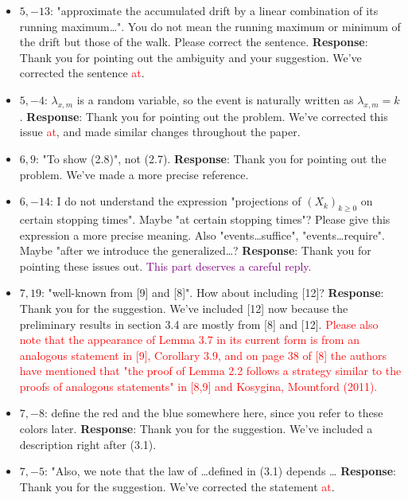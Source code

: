 \documentclass[11pt,a4paper]{article}
\numberwithin{equation}{section}
\newcommand{\edt}[1]{\textcolor{purple}{#1}} %
\def\TBF#1{\textcolor{red}{#1}} %
\begin{document}
\begin{itemize}
		
		\item 
		$5,-13$: "approximate the accumulated drift by a linear combination of its running maximum\dots". You do not mean the running maximum or minimum of the drift but those of the walk. Please correct the sentence.
		\subitem \textbf{Response}:
		Thank you for pointing out the ambiguity and your suggestion. We've corrected the sentence \TBF{at}.
		
		
		\item 
		$5,-4$: $\lambda_{x,m}$ is a random variable, so the event is naturally written as $\lambda_{x,m} = k$.
		\subitem \textbf{Response}:
		Thank you for pointing out the problem. We've corrected this issue \TBF{at}, and made similar changes throughout the paper.
		
		\item 
		$6,9$: "To show (2.8)", not (2.7).
		\subitem \textbf{Response}:
		Thank you for pointing out the problem. We've made a more precise reference.
		
		\item 
		$6,-14$: I do not understand the expression "projections of $(X_k)_{k\geq 0}$ on certain stopping times". Maybe "at certain stopping times"? Please give this expression a more precise meaning. Also "events\dots suffice", "events\dots require". Maybe "after we introduce the generalized\dots?
		\subitem \textbf{Response}:
		Thank you for pointing these issues out. \edt{This part deserves a careful reply.}
		
		\item 
		$7,19$: "well-known from [9] and [8]". How about including [12]?
		\subitem \textbf{Response}: Thank you for the suggestion. We've included [12] now because the preliminary results in section 3.4 are mostly from [8] and [12].
		\TBF{Please also note that the appearance of Lemma 3.7 in its current form is from an analogous statement in [9], Corollary 3.9, and on page 38 of [8] the authors have mentioned that "the proof of Lemma 2.2 follows a strategy similar to the proofs of analogous statements" in [8,9] and Kosygina, Mountford (2011). }
		
		\item 
		$7,-8$: define the red and the blue somewhere here, since you refer to these colors later.
		\subitem \textbf{Response}: Thank you for the suggestion. We've included a description right after (3.1).
		
		\item 
		$7,-5$: "Also, we note that the law of \dots defined in (3.1) depends \dots
		\subitem \textbf{Response}: Thank you for the suggestion. We've corrected the statement \TBF{at}.
		

\end{itemize}
\end{document}
